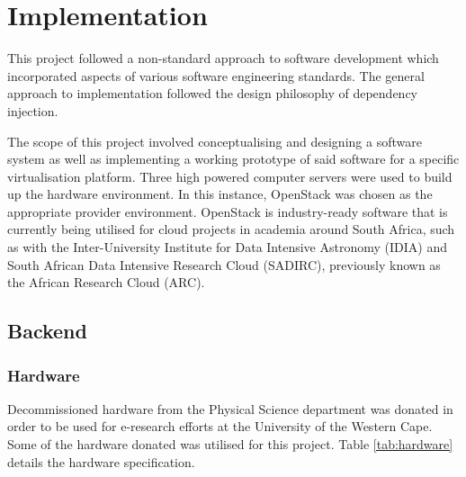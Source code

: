 
\chapter{Implementation} %

\label{Chapter3} %




This project followed a non-standard approach to software development which incorporated aspects of various software engineering standards. The general approach to implementation followed the design philosophy of dependency injection.

The scope of this project involved conceptualising and designing a software system as well as implementing a working prototype of said software for a specific virtualisation platform. Three high powered computer servers were used to build up the hardware environment. In this instance, OpenStack was chosen as the appropriate provider environment. OpenStack is industry-ready software that is currently being utilised for cloud projects in academia around South Africa, such as with the Inter-University Institute for Data Intensive Astronomy (IDIA) and South African Data Intensive Research Cloud (SADIRC), previously known as the African Research Cloud (ARC).

\section{Backend}

\subsection{Hardware}

Decommissioned hardware from the Physical Science department was donated in order to be used for e-research efforts at the University of the Western Cape. Some of the hardware donated was utilised for this project. Table \ref{tab:hardware} details the hardware specification.

